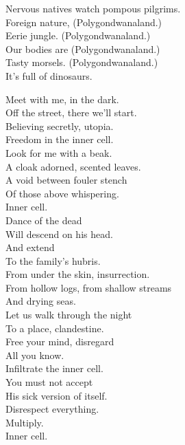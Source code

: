 Nervous natives watch pompous pilgrims. \\
Foreign nature, (Polygondwanaland.) \\
Eerie jungle. (Polygondwanaland.) \\
Our bodies are (Polygondwanaland.) \\
Tasty morsels. (Polygondwanaland.) \\

It's full of dinosaurs. \\





Meet with me, in the dark. \\
Off the street, there we'll start. \\
Believing secretly, utopia. \\
Freedom in the inner cell. \\

Look for me with a beak. \\
A cloak adorned, scented leaves. \\
A void between fouler stench \\
Of those above whispering. \\
Inner cell. \\

Dance of the dead \\
Will descend on his head. \\
And extend \\
To the family's hubris. \\

From under the skin, insurrection. \\
From hollow logs, from shallow streams \\
And drying seas. \\

Let us walk through the night \\
To a place, clandestine. \\
Free your mind, disregard \\
All you know. \\
Infiltrate the inner cell. \\

You must not accept \\
His sick version of  itself. \\
Disrespect everything. \\
Multiply. \\
Inner cell. \\

